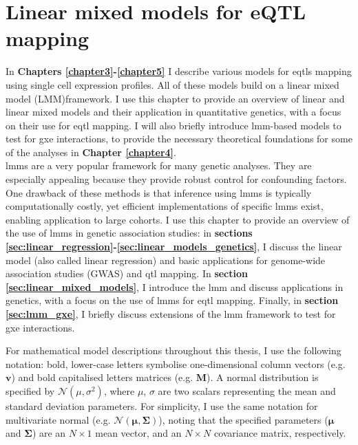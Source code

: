 
\chapter{Linear mixed models for eQTL mapping}
\label{chapter2}

In \textbf{Chapters \ref{chapter3}-\ref{chapter5}} I describe various models for \glspl{eqtl} mapping using single cell expression profiles. 
All of these models build on a linear mixed model (LMM)framework. 
I use this chapter to provide an overview of linear and linear mixed models and their application in quantitative genetics, with a focus on their use for \gls{eqtl} mapping. 
I will also briefly introduce \gls{lmm}-based models to test for \gls{gxe} interactions, to provide the necessary theoretical foundations for some of the analyses in \textbf{Chapter \ref{chapter4}}. \\

\gls{lmm}s are a very popular framework for many genetic analyses. 
They are especially appealing because they provide robust control for confounding factors. 
One drawback of these methods is that inference using \gls{lmm}s is typically computationally costly, yet efficient implementations of specific \gls{lmm}s exist, enabling application to large cohorts. 
I use this chapter to provide an overview of the use of \gls{lmm}s in genetic association studies: in \textbf{sections \ref{sec:linear_regression}-\ref{sec:linear_models_genetics}}, I discuss the linear model (also called linear regression) and basic applications for genome-wide association studies (GWAS) and \gls{qtl} mapping. 
In \textbf{section \ref{sec:linear_mixed_models}}, I introduce the \gls{lmm} and discuss applications in genetics, with a focus on the use of \gls{lmm}s for \gls{eqtl} mapping. 
Finally, in \textbf{section \ref{sec:lmm_gxe}}, I briefly discuss extensions of the \gls{lmm} framework to test for \gls{gxe} interactions.\\

\newpage

For mathematical model descriptions throughout this thesis, I use the following notation: bold, lower-case letters symbolise one-dimensional column vectors (e.g. $\mathbf{v}$) and bold capitalised letters matrices (e.g. $\mathbf{M}$). 
A normal distribution is specified by $ \mathcal{N}(\mu, \sigma^2)$, where $\mu$, $\sigma$ are two scalars representing the mean and standard deviation parameters.
For simplicity, I use the same notation for multivariate normal (e.g. $ \mathcal{N}(\boldsymbol{\mu}, \boldsymbol{\Sigma})$), noting that the specified parameters ($\boldsymbol{\mu}$ and $\boldsymbol{\Sigma}$) are an $N \times 1$ mean vector, and an $N \times N$ covariance matrix, respectively.

